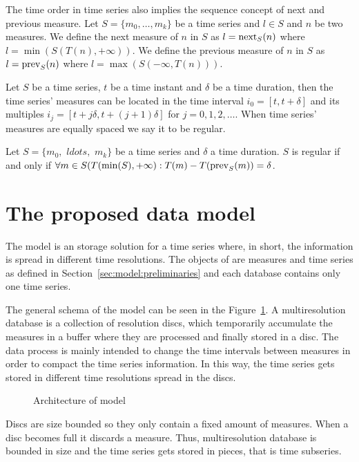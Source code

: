 The time order in time series also implies the sequence concept of
next and previous measure.  Let $S=\{m_0, \ldots, m_k\}$ be a time
series and $l\in S$ and $n$ be two measures. We define the next
measure of $n$ in $S$ as $l=\operatorname*{next}_S(n)$ where $l =
\min(S(T(n),+\infty))$. We define the previous measure of $n$ in $S$
as $l=\operatorname*{prev}_S(n)$ where $l = \max(S(-\infty,T(n)))$.

Let $S$ be a time series, $t$ be a time instant and $\delta$ be a
time duration, then the time series' measures can be located in the
time interval $i_0=[t, t+\delta]$ and its multiples $i_j=[t+j\delta,
t+(j+1)\delta]$ for $j=0,1,2,\ldots$. When time series' measures are
equally spaced we say it to be regular.
\begin{definition}
  Let $S=\{m_0,$ $ldots,$ $m_k\}$ be a time series and $\delta$ a time
  duration. $S$ is regular if and only if $\forall m \in
  S(T(\min(S),+\infty):T(m) - T(\operatorname*{prev}_S(m)) = \delta$.
\end{definition}

\section{The proposed data model}
\label{sec:MTSMS}

The  model is an storage solution for a time series where,
in short, the information is spread in different time resolutions.
The objects of  are measures and time series as defined in
Section~\ref{sec:model:preliminaries} and each  database
contains only one time series.

The general schema of the  model can be seen in the
Figure~\ref{fig:model:mtsdb}.  A multiresolution database is a
collection of resolution discs, which temporarily accumulate the
measures in a buffer where they are processed and finally stored in a
disc. The data process is mainly intended to change the time intervals
between measures in order to compact the time series information. In
this way, the time series gets stored in different time resolutions
spread in the discs.

\begin{figure}[tp]
  \centering
  
  \smallskip
  \caption{Architecture of  model}
  \label{fig:model:mtsdb}
\end{figure}

Discs are size bounded so they only contain a fixed amount of
measures. When a disc becomes full it discards a measure. Thus,
multiresolution database is bounded in size and the time series gets
stored in pieces, that is time subseries.

